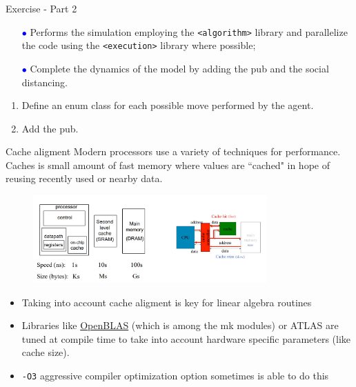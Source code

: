 \documentclass[10pt,aspectratio=169]{beamer}
\begin{document}
\begin{frame}{Exercise - Part 2}
    \begin{itemize}
        \item[\textcolor{blue}{$\bullet$}] Performs the simulation employing the \texttt{<algorithm>} library and parallelize the code using the \texttt{<execution>} library where possible;
        \item[\textcolor{blue}{$\bullet$}] Complete the dynamics of the model by adding the pub and the social distancing. 
    \end{itemize}
    \begin{enumerate}
    	\item Define an enum class for each possible move performed by the agent.
    	\item Add the pub.
    \end{enumerate}
\end{frame}

\begin{frame}{Cache aligment}
    Modern processors use a variety of techniques for performance. Caches is small amount of fast memory where values are ``cached" in hope of reusing recently used or nearby data.
    \begin{figure}
        \centering\includegraphics[width=0.8\textwidth]{cache.png}
    \end{figure}
    \begin{itemize}
        \item Taking into account cache aligment is key for linear algebra routines
        \item Libraries like \href{https://github.com/xianyi/OpenBLAS}{OpenBLAS} (which is among the mk modules) or ATLAS are tuned at compile time to take into account hardware specific parameters (like cache size).
        \item \texttt{-O3} aggressive compiler optimization option sometimes is able to do this
    \end{itemize}
\end{frame}
\end{document}
